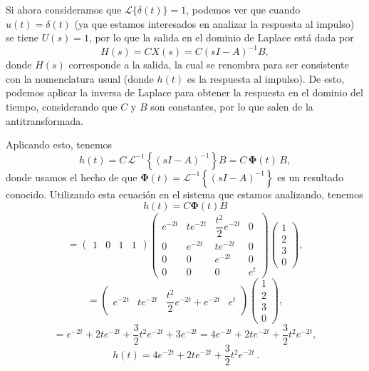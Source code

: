 \documentclass[
  11pt,
  letterpaper,
   addpoints,
   answers
  ]{exam}
\begin{document}
\begin{questions}
\begin{solution}
Si ahora consideramos que $\mathcal{L}\{\delta(t)\}=1$, podemos ver que cuando $u(t)=\delta(t)$ (ya que estamos interesados en analizar la respuesta al impulso) se tiene $U(s)=1$, por lo que la salida en el dominio de Laplace está dada por
\begin{equation}
H(s)=CX(s)=C(sI-A)^{-1}B,
\end{equation}
donde $H(s)$ corresponde a la salida, la cual se renombra para ser consistente con la nomenclatura usual (donde $h(t)$ es la respuesta al impulso). De esto, podemos aplicar la inversa de Laplace para obtener la respuesta en el dominio del tiempo, considerando que $C$ y $B$ son constantes, por lo que salen de la antitransformada.

Aplicando esto, tenemos
\begin{equation}
h(t)=C\,\mathcal{L}^{-1}\!\left\{(sI-A)^{-1}\right\}B
= C\,\bm{\Phi}(t)\,B,
\end{equation}
donde usamos el hecho de que $\bm{\Phi}(t)=\mathcal{L}^{-1}\!\left\{(sI-A)^{-1}\right\}$ es un resultado conocido. Utilizando esta ecuación en el sistema que estamos analizando, tenemos
\begin{equation}
h(t)=C\bm{\Phi}(t)B
\end{equation}
\begin{equation}
=\begin{pmatrix}1&0&1&1\end{pmatrix}
\begin{pmatrix}
e^{-2t} & t e^{-2t} & \dfrac{t^{2}}{2}e^{-2t} & 0\\
0 & e^{-2t} & t e^{-2t} & 0\\
0 & 0 & e^{-2t} & 0\\
0 & 0 & 0 & e^{t}
\end{pmatrix}
\begin{pmatrix}
1\\ 2\\ 3\\ 0
\end{pmatrix},
\end{equation}
\begin{equation}
=\begin{pmatrix}
e^{-2t} & t e^{-2t} & \dfrac{t^{2}}{2}e^{-2t}+e^{-2t} & e^{t}
\end{pmatrix}
\begin{pmatrix}
1\\ 2\\ 3\\ 0
\end{pmatrix},
\end{equation}
\begin{equation}
= e^{-2t}+2t e^{-2t}+\frac{3}{2}t^{2}e^{-2t}+3e^{-2t}
= 4e^{-2t}+2t e^{-2t}+\frac{3}{2}t^{2}e^{-2t},
\end{equation}
\begin{equation}
\boxed{\,h(t)=4e^{-2t}+2t e^{-2t}+\frac{3}{2}t^{2}e^{-2t}\,}.
\end{equation}


\end{solution}
\end{questions}
\end{document}
